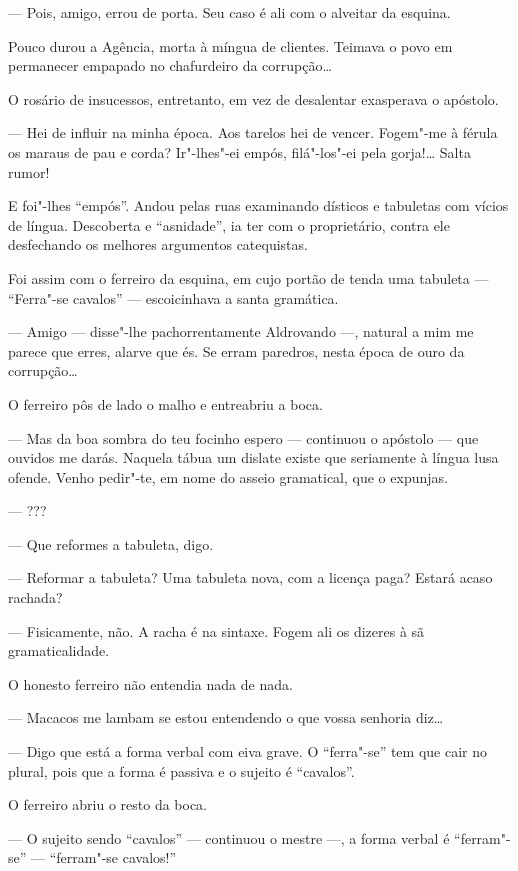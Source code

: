 --- Pois, amigo, errou de porta. Seu caso é ali com o alveitar da
esquina.

Pouco durou a Agência, morta à míngua de clientes. Teimava o povo em
permanecer empapado no chafurdeiro da corrupção\ldots{}

O rosário de insucessos, entretanto, em vez de desalentar exasperava o
apóstolo.

--- Hei de influir na minha época. Aos tarelos hei de vencer. Fogem"-me à
férula os maraus de pau e corda? Ir"-lhes"-ei empós, filá"-los"-ei pela
gorja!\ldots{} Salta rumor!

E foi"-lhes ``empós''. Andou pelas ruas examinando dísticos e tabuletas
com vícios de língua. Descoberta e ``asnidade'', ia ter com o
proprietário, contra ele desfechando os melhores argumentos catequistas.

Foi assim com o ferreiro da esquina, em cujo portão de tenda uma
tabuleta --- ``Ferra"-se cavalos'' --- escoicinhava a santa gramática.

--- Amigo --- disse"-lhe pachorrentamente Aldrovando ---, natural a mim
me parece que erres, alarve que és. Se erram paredros, nesta época de
ouro da corrupção\ldots{}

O ferreiro pôs de lado o malho e entreabriu a boca.

--- Mas da boa sombra do teu focinho espero --- continuou o apóstolo ---
que ouvidos me darás. Naquela tábua um dislate existe que seriamente à
língua lusa ofende. Venho pedir"-te, em nome do asseio gramatical, que o
expunjas.

--- ???

--- Que reformes a tabuleta, digo.

--- Reformar a tabuleta? Uma tabuleta nova, com a licença paga? Estará
acaso rachada?

--- Fisicamente, não. A racha é na sintaxe. Fogem ali os dizeres à sã
gramaticalidade.

O honesto ferreiro não entendia nada de nada.

--- Macacos me lambam se estou entendendo o que vossa senhoria diz\ldots{}

--- Digo que está a forma verbal com eiva grave. O ``ferra"-se'' tem que
cair no plural, pois que a forma é passiva e o sujeito é ``cavalos''.

O ferreiro abriu o resto da boca.

--- O sujeito sendo ``cavalos'' --- continuou o mestre ---, a forma
verbal é ``ferram"-se'' --- ``ferram"-se cavalos!''

